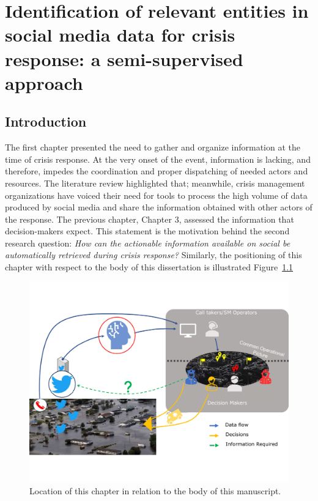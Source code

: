 \chapter {Identification of relevant entities in social media data for crisis response: a semi-supervised approach}

\section*{Introduction}
The first chapter presented the need to gather and organize information at the time of crisis
response.
At the very onset of the event, information is lacking, and therefore,
impedes the coordination and proper dispatching of needed actors and resources.
The literature review highlighted that; meanwhile, crisis management organizations have
voiced their need for tools to process the high volume of data produced by social media
and share the information obtained with other actors of the response.
The previous chapter, Chapter 3, assessed the information that decision-makers expect.
This statement is the motivation behind the second research question: \textit{How can the actionable information available on social be automatically retrieved during crisis response?}
Similarly, the positioning of this chapter with respect to the body of this dissertation is illustrated Figure~\ref{processing:big-picture-manuscrit}

\begin{figure}[htb]
    \centering
    \includegraphics[width=\textwidth]{figures/chap-4/position-chapter.pdf}
    \caption{Location of this chapter in relation to the body of this manuscript.}
    \label{processing:big-picture-manuscrit}
\end{figure}

